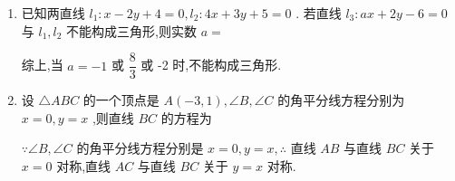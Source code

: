 \begin{enumerate}
\begin{enumerate}
\begin{jieda}
            因为 $\dfrac{{\left| PA\right| }^{2} + {\left| PB\right| }^{2}}{2} \geq  {\left( \dfrac{\left| {PA}\right|  + \left| {PB}\right| }{2}\right) }^{2}$，所以 $\left| {PA}\right|  + \left| {PB}\right|  \leq  \sqrt{2\left( {{\left| PA\right| }^{2} + {\left| PB\right| }^{2}}\right) } = \sqrt{2 \times  {18}} = 6$ ,当且仅当 $\left| {PA}\right|  = \left| {PB}\right|  = 3$ 时取等号.
        \end{jieda}
        \item 已知两直线 ${l}_{1} : x - {2y} + 4 = 0,{l}_{2} : {4x} + {3y} + 5 = 0$ . 若直线 ${l}_{3} : {ax} + {2y} - 6 = 0$ 与 ${l}_{1},{l}_{2}$ 不能构成三角形,则实数 $a=$
        \begin{jieda}
            综上,当 $a =  - 1$ 或 $\dfrac{8}{3}$ 或 -2 时,不能构成三角形.
        \end{jieda}
        \item 设 $\bigtriangleup {ABC}$ 的一个顶点是 $A\left( {-3,1}\right) ,\angle B,\angle C$ 的角平分线方程分别为 $x = 0,y = x$ ,则直线 ${BC}$ 的方程为
        \begin{jieda}
            $\because \angle B,\angle C$ 的角平分线方程分别是 $x = 0,y = x,\therefore$ 直线 ${AB}$ 与直线 ${BC}$ 关于 $x = 0$ 对称,直线 ${AC}$ 与直线 ${BC}$
            关于 $y = x$ 对称. 
            

\end{jieda}
\end{enumerate}
\end{enumerate}
